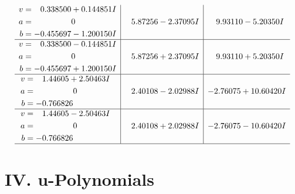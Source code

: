 \documentclass[1p]{elsarticle_modified}
\theoremstyle{definition}
\begin{document}
$$\begin{array}{c|c|c}
\begin{aligned}
v &= \phantom{-}0.338500 + 0.144851 I \\
a &= \phantom{-0.000000 } 0 \\
b &= -0.455697 - 1.200150 I\end{aligned}
 & \phantom{-}5.87256 - 2.37095 I & \phantom{-}9.93110 - 5.20350 I \\ \hline\begin{aligned}
v &= \phantom{-}0.338500 - 0.144851 I \\
a &= \phantom{-0.000000 } 0 \\
b &= -0.455697 + 1.200150 I\end{aligned}
 & \phantom{-}5.87256 + 2.37095 I & \phantom{-}9.93110 + 5.20350 I \\ \hline\begin{aligned}
v &= \phantom{-}1.44605 + 2.50463 I \\
a &= \phantom{-0.000000 } 0 \\
b &= -0.766826\phantom{ +0.000000I}\end{aligned}
 & \phantom{-}2.40108 - 2.02988 I & -2.76075 + 10.60420 I \\ \hline\begin{aligned}
v &= \phantom{-}1.44605 - 2.50463 I \\
a &= \phantom{-0.000000 } 0 \\
b &= -0.766826\phantom{ +0.000000I}\end{aligned}
 & \phantom{-}2.40108 + 2.02988 I & -2.76075 - 10.60420 I\\
 \hline 
 \end{array}$$\newpage
\newpage\renewcommand{\arraystretch}{1}
\centering \section*{ IV. u-Polynomials}
\end{document}
